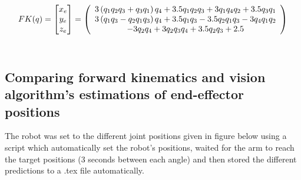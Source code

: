 \documentclass{report}
\let\cos\relax
\let\sin\relax
\newcommand{\sin}[1]{\mathit{S}_{#1}}
\newcommand{\cos}[1]{\mathit{C}_{#1}}
\begin{document}
\begin{equation*}
FK(q) = 
\begin{bmatrix}
           x_{e} \\
           y_{e} \\
           z_{e}
\end{bmatrix} = 
\left(\begin{array}{c} %
    3 \left(\sin{q_{1}} \sin{q_{2}} \cos{q_{3}} + \sin{q_{3}} \cos{q_{1}}\right) \cos{q_{4}}  %
    + 3.5 \sin{q_{1}} \sin{q_{2}} \cos{q_{3}} %
    + 3 \sin{q_{1}} \sin{q_{4}} \cos{q_{2} } %
    + 3.5 \sin{q_{3}} \cos{q_{1}} %
    \\
    3 \left(\sin{q_{1}} \sin{q_{3}} %
    - \sin{q_{2}} \cos{q_{1}} \cos{q_{3}}\right) \cos{q_{4}} %
    + 3.5 \sin{q_{1}} \sin{q_{3}} %
    - 3.5 \sin{q_{2}} \cos{q_{1}} \cos{q_{3}} %
    - 3 \sin{q_{4}} \cos{q_{1}} \cos{q_{2}} %
    \\
    - 3 \sin{q_{2}} \sin{q_{4}} %
    + 3 \cos{q_{2}} \cos{q_{3}} \cos{q_{4}} %
    + 3.5 \cos{q_{2}} \cos{q_{3}} + 2.5
    \end{array}\right)
\end{equation*} \\


\subsection*{Comparing forward kinematics and vision algorithm's estimations of end-effector positions}

The robot was set to the different joint positions given in figure below using a script which automatically set the robot's positions, waited for the arm to reach the target positions (3 seconds between each angle) and then stored the different predictions to a .tex file automatically.
\\
\end{document}
